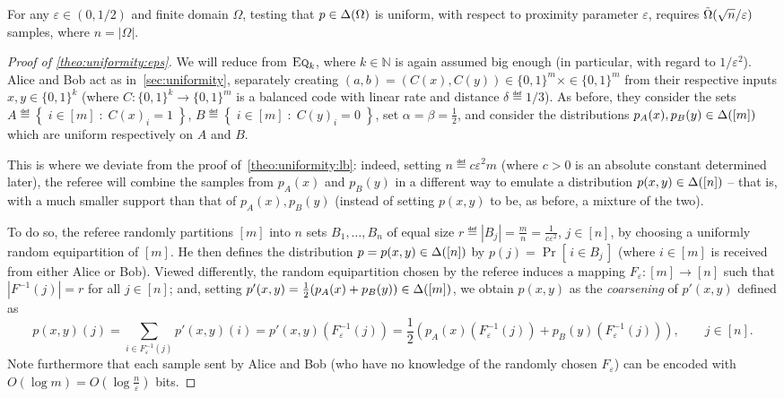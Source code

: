 \documentclass[11pt]{article}
\theoremstyle{remark}   	\newtheorem{remark}[theorem]{Remark}
\theoremstyle{definition}   	\newaliascnt{defn}{theorem}
\newenvironment{proofof}[1]{\begin{proof}[Proof of {#1}]}{\end{proof}}
\newcommand{\eps}{\ensuremath{\varepsilon}\xspace}
\newcommand{\tildeOmega}[1]{\operatorname{\tilde{\Omega}}\mleft( #1 \mright)}
\newcommand{\setOfSuchThat}[2]{ \left\{\; #1 \;\colon\; #2\; \right\} } 			\newcommand{\indicSet}[1]{\mathds{1}_{#1}}                                              \newcommand{\indic}[1]{\indicSet{\left\{#1\right\}}}                                             \newcommand{\disjunion}{\amalg}
\newcommand{\proba}{\Pr}
\newcommand{\probaOf}[1]{\proba\!\left[\, #1\, \right]}
\newcommand{\abs}[1]{\left\lvert #1 \right\rvert}
\newcommand{\N}{\ensuremath{\mathbb{N}}\xspace}
\newcommand{\bitset}{\ensuremath{\{0,1\}}}
\newcommand{\EQ}[1][n]{\textsc{Eq}_{#1}}
\begin{document}
\begin{theorem}\label{theo:uniformity:eps}
For any $\eps\in(0,1/2)$ and finite domain $\Omega$, testing that $p\in \Delta\!\left(\Omega\right)$ is uniform, with respect to proximity parameter $\eps$, requires $\tildeOmega{\sqrt{n}/\eps}$ samples, where $n = |\Omega|$.
\end{theorem}
\begin{proofof}{\autoref{theo:uniformity:eps}}
We will reduce from $\EQ[k]$, where $k\in\N$ is again assumed big enough (in particular, with regard to $1/\eps^2$). Alice and Bob act as in~\autoref{sec:uniformity}, separately creating $(a,b)=(C(x),C(y))\in\{0,1\}^m\times \in\{0,1\}^m$ from their respective inputs $x,y\in \{0,1\}^k$ (where $C\colon \bitset^k \to \bitset^m$ is a balanced code with linear rate and distance $\delta\eqdef 1/3$). As before, they consider the sets $A\eqdef \setOfSuchThat{ i\in[m] }{ C(x)_i=1 }$, $B\eqdef \setOfSuchThat{ i\in[m] }{ C(y)_i=0 }$, set $\alpha=\beta=\frac{1}{2}$, and consider the distributions $p_A(x),p_B(y)\in\Delta\!\left([m]\right)$ which are uniform respectively on $A$ and $B$.

This is where we deviate from the proof of~\autoref{theo:uniformity:lb}: indeed, setting $n\eqdef c \eps^2 m$ (where $c>0$ is an absolute constant determined later), the referee will combine the samples from $p_A(x)$ and $p_B(y)$ in a different way to emulate a distribution $p(x,y)\in\Delta\!\left([n]\right)$ -- that is, with a much smaller support than that of $p_A(x),p_B(y)$ (instead of setting $p(x,y)$ to be, as before, a mixture of the two).

To do so, the referee randomly partitions $[m]$ into $n$ sets $B_1,\dots, B_n$ of equal size $r\eqdef \abs{B_j} = \frac{m}{n} = \frac{1}{c\eps^2}$, $j\in[n]$, by choosing a uniformly random equipartition of $[m]$. He then defines the distribution $p=p(x,y)\in\Delta\!\left([n]\right)$ by $p(j) = \probaOf{ i \in B_j }$ (where $i\in[m]$ is received from either Alice or Bob). Viewed differently, the random equipartition chosen by the referee induces a mapping $F_\eps\colon [m] \to [n]$ such that $\abs{F^{-1}(j)} = r$ for all $j\in[n]$; and, setting $p'(x,y) = \frac{1}{2}(p_A(x)+p_B(y))\in\Delta\!\left([m]\right)$, we obtain $p(x,y)$ as the \emph{coarsening} of $p'(x,y)$ defined as
\[
    p(x,y)(j) = \sum_{i\in F_\eps^{-1}(j)} p'(x,y)(i) = p'(x,y)( F_\eps^{-1}(j) ) = \frac{1}{2}\left( p_A(x)( F_\eps^{-1}(j) ) +p_B(y)( F_\eps^{-1}(j) ) \right), \qquad j\in [n].
\]
Note furthermore that each sample sent by Alice and Bob (who have no knowledge of the randomly chosen $F_\eps$) can be encoded with $O(\log m) = O(\log\frac{n}{\eps})$ bits.


\end{proofof}
\end{document}

